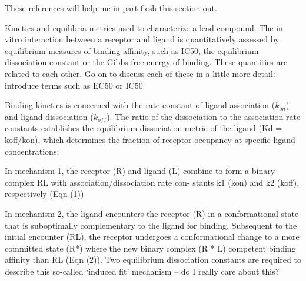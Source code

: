 

These references will help me in part flesh this section out.\cite{Lu:2010jh,Kortagere:2010fc,Nunez:2012il,Copeland:2011dl,Prinz:2008kr,Sikazwe:2012gu,Copeland:2006bb}



Kinetics and equilibria metrics used to characterize a lead compound. The in vitro interaction between a receptor and ligand is quantitatively assessed by equilibrium measures of binding affinity, such as IC50, the equilibrium dissociation constant or the Gibbs free energy of binding. These quantities are related to each other.
Go on to discuss each of these in a little more detail:
introduce terms such as EC50 or IC50


Binding kinetics is concerned with the rate constant of ligand association ($k_{on}$) and ligand dissociation ($k_{off}$). The ratio of the dissociation to the association rate constants establishes the equilibrium dissociation metric of the ligand (Kd = koff/kon), which determines the fraction of receptor occupancy at specific ligand concentrations; 

In mechanism 1, the receptor (R) and ligand (L) combine to form a binary complex RL with association/dissociation rate con- stants k1 (kon) and k2 (koff), respectively (Eqn (1))

In mechanism 2, the ligand encounters the receptor (R) in a conformational state that is suboptimally complementary to the ligand for binding. Subsequent to the initial encounter (RL), the receptor undergoes a conformational change to a more committed state (R*) where the new binary complex (R * L) competent binding affinity than RL (Eqn (2)).
Two equilibrium dissociation constants are required to describe this so-called ‘induced fit’ mechanism -- do I really care about this?

